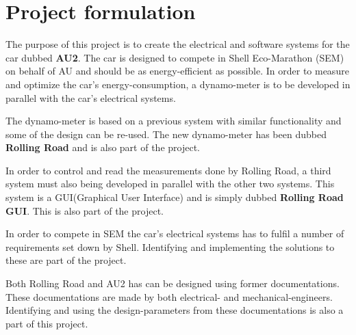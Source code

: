 \chapter{Project formulation}
The purpose of this project is to create the electrical and software systems for the car dubbed \textbf{AU2}. The car is designed to compete in Shell Eco-Marathon (SEM) on behalf of AU and should be as energy-efficient as possible. In order to measure and optimize the car's energy-consumption, a dynamo-meter is to be developed in parallel with the car's electrical systems. 

The dynamo-meter is based on a previous system with similar functionality\cite{BAC_rullefelt} and some of the design can be re-used. The new dynamo-meter has been dubbed \textbf{Rolling Road} and is also part of the project.

In order to control and read the measurements done by Rolling Road, a third system must also being developed in parallel with the other two systems. This system is a GUI(Graphical User Interface) and is simply dubbed \textbf{Rolling Road GUI}. This is also part of the project.

In order to compete in SEM the car's electrical systems has to fulfil a number of requirements set down by Shell\cite{AU2}. Identifying and implementing the solutions to these are part of the project.

Both Rolling Road and AU2 has can be designed using former documentations\cite{BAC_rullefelt}\cite{BAC_zenith33}. These documentations are made by both electrical- and mechanical-engineers. Identifying and using the design-parameters from these documentations is also a part of this project.

\newpage
